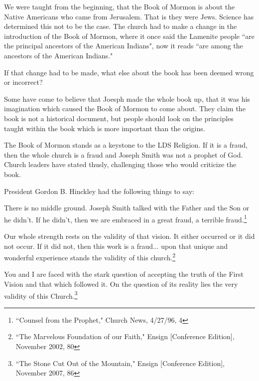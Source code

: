 We were taught from the beginning, that the Book of Mormon is about the Native
Americans who came from Jerusalem. That is they were Jews. Science has determined
this not to be the case. The church had to make a change in the introduction of the
Book of Mormon, where it once said the Lamenite people ``are the principal ancestors 
of the American Indians", now it reads ``are among the ancestors of the American 
Indians."

If that change had to be made, what else about the book has been deemed wrong or
incorrect?

Some have come to believe that Joesph made the whole book up, that it was his
imagination which caused the Book of Mormon to come about. They claim the book is not
a historical document, but people should look on the principles taught within the
book which is more important than the origins.

The Book of Mormon stands as a keystone to the LDS Religion. If it is a fraud, then
the whole church is a fraud and Joseph Smith was not a prophet of God. Church leaders
have stated thusly, challenging those who would criticize the book.

President Gordon B. Hinckley had the following things to say:

\begin{displayquote}
There is no middle ground. Joseph Smith talked with the Father and the Son or 
he didn’t. If he didn’t, then we are embraced in a great fraud, a terrible 
fraud.\footnote{``Counsel from the Prophet," Church News, 4/27/96, 4}
\end{displayquote}

\begin{displayquote}
Our whole strength rests on the validity of that vision. It either occurred or 
it did not occur. If it did not, then this work is a fraud... upon that unique and 
wonderful experience stands the validity of this church.\footnote{
``The Marvelous Foundation of our Faith," Ensign [Conference Edition], 
November 2002, 80
}
\end{displayquote}

\begin{displayquote}
You and I are faced with the stark question of accepting the truth of the First 
Vision and that which followed it. On the question of its reality lies the very 
validity of this Church.\footnote{``The Stone Cut Out of the Mountain," Ensign 
[Conference Edition], November 2007, 86}
\end{displayquote}

